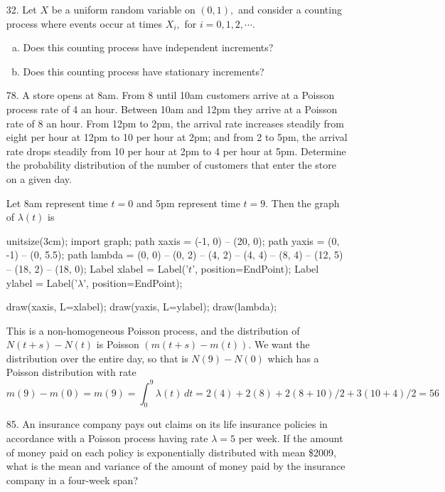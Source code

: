 \documentclass{article}
\begin{document}
\begin{itemize}
	\item[32.] Let $X$ be a uniform random variable on $(0, 1),$ and consider a counting process where events occur at times $X_i,$ for $i=0, 1, 2, \cdots.$ 
		\begin{enumerate}[(a)]
			\item Does this counting process have independent increments?
				\begin{soln}
					
				\end{soln}

			\item Does this counting process have stationary increments?
				
		\end{enumerate}

	\item[78.] A store opens at 8am. From 8 until 10am customers arrive at a Poisson process rate of 4 an hour. Between 10am and 12pm they arrive at a Poisson rate of 8 an hour. From 12pm to 2pm, the arrival rate increases steadily from eight per hour at 12pm to 10 per hour at 2pm; and from 2 to 5pm, the arrival rate drops steadily from 10 per hour at 2pm to 4 per hour at 5pm. Determine the probability distribution of the number of customers that enter the store on a given day.
		\begin{soln}
			Let 8am represent time $t=0$ and 5pm represent time $t=9.$ Then the graph of $\lambda(t)$ is
					\begin{center}
						\begin{asy}
							unitsize(3cm);
							import graph;
							path xaxis = (-1, 0) -- (20, 0);
							path yaxis = (0, -1) -- (0, 5.5);
							path lambda = (0, 0) -- (0, 2) -- (4, 2) -- (4, 4) -- (8, 4) -- (12, 5) -- (18, 2) -- (18, 0);
							Label xlabel = Label('$t$', position=EndPoint);
							Label ylabel = Label('$\lambda$', position=EndPoint);

							draw(xaxis, L=xlabel);
							draw(yaxis, L=ylabel);
							draw(lambda);
						\end{asy}
					\end{center}
					This is a non-homogeneous Poisson process, and the distribution of $N(t+s)-N(t)$ is Poisson $(m(t+s)-m(t)).$ We want the distribution over the entire day, so that is $N(9)-N(0)$ which has a Poisson distribution with rate
					\[m(9)-m(0) = m(9) = \int_0^9 \lambda(t)\, dt = 2(4) + 2(8) + 2(8+10)/2 + 3(10+4)/2 = 56\]
		\end{soln}

	\item[85.] An insurance company pays out claims on its life insurance policies in accordance with a Poisson process having rate $\lambda=5$ per week. If the amount of money paid on each policy is exponentially distributed with mean \$2009, what is the mean and variance of the amount of money paid by the insurance company in a four-week span?


\end{itemize}
\end{document}
